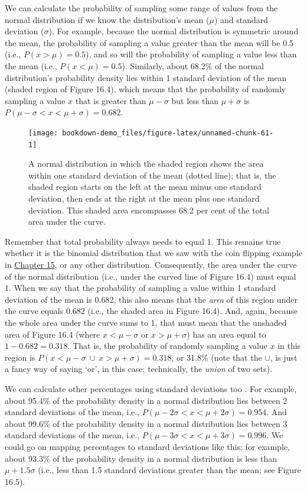 \documentclass[
  openany]{krantz}
\begin{document}
We can calculate the probability of sampling some range of values from the normal distribution if we know the distribution's mean (\(\mu\)) and standard deviation (\(\sigma\)).
For example, because the normal distribution is symmetric around the mean, the probability of sampling a value greater than the mean will be 0.5 (i.e., \(P(x > \mu) = 0.5\)), and so will the probability of sampling a value less than the mean (i.e., \(P(x < \mu) = 0.5\)).
Similarly, about 68.2\% of the normal distribution's probability density lies within 1 standard deviation of the mean (shaded region of Figure 16.4), which means that the probability of randomly sampling a value \(x\) that is greater than \(\mu - \sigma\) but less than \(\mu + \sigma\) is \(P(\mu - \sigma < x < \mu + \sigma) = 0.682\).

\begin{figure}
\texttt{[image: bookdown-demo\_files/figure-latex/unnamed-chunk-61-1]} \caption{A normal distribution in which the shaded region shows the area within one standard deviation of the mean (dotted line); that is, the shaded region starts on the left at the mean minus one standard deviation, then ends at the right at the mean plus one standard deviation. This shaded area encompasses 68.2 per cent of the total area under the curve.}\label{fig:unnamed-chunk-61}
\end{figure}

Remember that total probability always needs to equal 1.
This remains true whether it is the binomial distribution that we saw with the coin flipping example in \protect\hyperlink{Chapter_15}{Chapter 15}, or any other distribution.
Consequently, the area under the curve of the normal distribution (i.e., under the curved line of Figure 16.4) must equal 1.
When we say that the probability of sampling a value within 1 standard deviation of the mean is 0.682, this also means that the \emph{area} of this region under the curve equals 0.682 (i.e., the shaded area in Figure 16.4).
And, again, because the whole area under the curve sums to 1, that must mean that the unshaded area of Figure 16.4 (where \(x < \mu -\sigma\) or \(x > \mu + \sigma\)) has an area equal to \(1 - 0.682 = 0.318\).
That is, the probability of randomly sampling a value \(x\) in this region is \(P(x < \mu - \sigma \: \cup \: x > \mu + \sigma) = 0.318\), or 31.8\% (note that the \(\cup\), is just a fancy way of saying `or', in this case; technically, the \emph{union} of two sets).

We can calculate other percentages using standard deviations too \citep{Sokal1995}.
For example, about 95.4\% of the probability density in a normal distribution lies between 2 standard deviations of the mean, i.e., \(P(\mu - 2\sigma < x < \mu + 2\sigma) = 0.954\).
And about 99.6\% of the probability density in a normal distribution lies between 3 standard deviations of the mean, i.e., \(P(\mu - 3\sigma < x < \mu + 3\sigma) = 0.996\).
We could go on mapping percentages to standard deviations like this; for example, about 93.3\% of the probability density in a normal distribution is less than \(\mu + 1.5\sigma\) (i.e., less than 1.5 standard deviations greater than the mean; see Figure 16.5).
\end{document}
